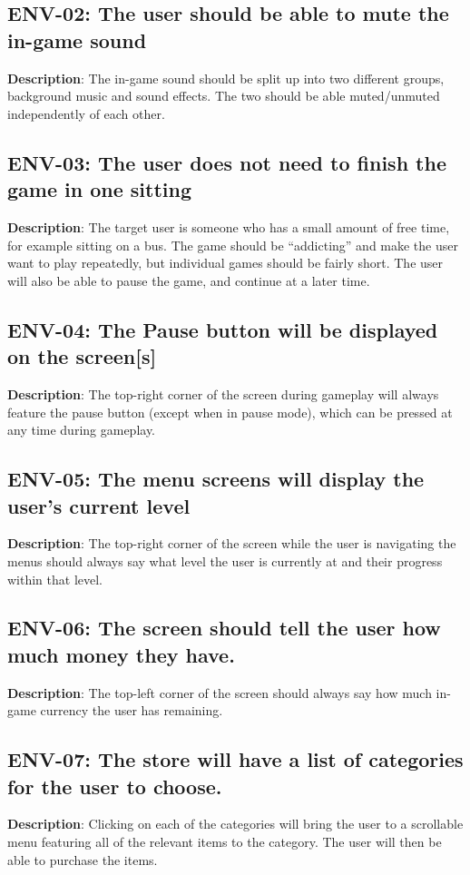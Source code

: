 \subsection{ENV-02: The user should be able to mute the in-game sound }
\textbf{Description}: The in-game sound should be split up into two different
groups, background music and sound effects. The two should be able
muted/unmuted independently of each other.

\subsection{ENV-03: The user does not need to finish the game in one sitting}
\textbf{Description}: The target user is someone who has a small amount of
free time, for example sitting on a bus. The game should be \textquotedblleft{}addicting\textquotedblright{}
and make the user want to play repeatedly, but individual games should
be fairly short. The user will also be able to pause the game, and
continue at a later time.

\subsection{ENV-04: The Pause button will be displayed on the screen{[}s{]}}
\textbf{Description}: The top-right corner of the screen during gameplay will
always feature the pause button (except when in pause mode), which
can be pressed at any time during gameplay.

\subsection{ENV-05: The menu screens will display the user\textquoteright{}s
current level}
\textbf{Description}: The top-right corner of the screen while the user is
navigating the menus should always say what level the user is currently
at and their progress within that level.

\subsection{ENV-06: The screen should tell the user how much money they have.}
\textbf{Description}: The top-left corner of the screen should always say how
much in-game currency the user has remaining.

\subsection{ENV-07: The store will have a list of categories for the user to
choose. }
\textbf{Description}: Clicking on each of the categories will bring the user
to a scrollable menu featuring all of the relevant items to the category.
The user will then be able to purchase the items. 

